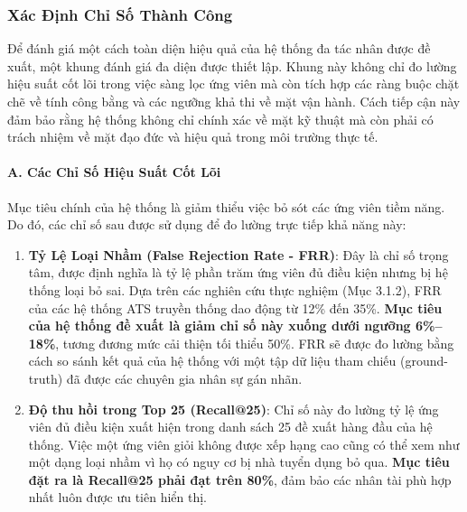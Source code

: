 \documentclass{article}
\begin{document}
\subsubsection{Xác Định Chỉ Số Thành Công}
Để đánh giá một cách toàn diện hiệu quả của hệ thống đa tác nhân được đề xuất, một khung đánh giá đa diện được thiết lập. Khung này không chỉ đo lường hiệu suất cốt lõi trong việc sàng lọc ứng viên mà còn tích hợp các ràng buộc chặt chẽ về tính công bằng và các ngưỡng khả thi về mặt vận hành. Cách tiếp cận này đảm bảo rằng hệ thống không chỉ chính xác về mặt kỹ thuật mà còn phải có trách nhiệm về mặt đạo đức và hiệu quả trong môi trường thực tế.

\paragraph{A. Các Chỉ Số Hiệu Suất Cốt Lõi}

Mục tiêu chính của hệ thống là giảm thiểu việc bỏ sót các ứng viên tiềm năng. Do đó, các chỉ số sau được sử dụng để đo lường trực tiếp khả năng này:
\begin{enumerate}[topsep=0pt, itemsep=4pt, leftmargin=40pt, label=\arabic*.]
    \item \textbf{Tỷ Lệ Loại Nhầm (False Rejection Rate - FRR)}: Đây là chỉ số trọng tâm, được định nghĩa là tỷ lệ phần trăm ứng viên đủ điều kiện nhưng bị hệ thống loại bỏ sai. Dựa trên các nghiên cứu thực nghiệm (Mục 3.1.2), FRR của các hệ thống ATS truyền thống dao động từ 12\% đến 35\%. \textbf{Mục tiêu của hệ thống đề xuất là giảm chỉ số này xuống dưới ngưỡng 6\%–18\%}, tương đương mức cải thiện tối thiểu 50\%. FRR sẽ được đo lường bằng cách so sánh kết quả của hệ thống với một tập dữ liệu tham chiếu (ground-truth) đã được các chuyên gia nhân sự gán nhãn.
   \item \textbf{Độ thu hồi trong Top 25 (Recall@25)}: Chỉ số này đo lường tỷ lệ ứng viên đủ điều kiện xuất hiện trong danh sách 25 đề xuất hàng đầu của hệ thống. Việc một ứng viên giỏi không được xếp hạng cao cũng có thể xem như một dạng loại nhầm vì họ có nguy cơ bị nhà tuyển dụng bỏ qua. \textbf{Mục tiêu đặt ra là Recall@25 phải đạt trên 80\%}, đảm bảo các nhân tài phù hợp nhất luôn được ưu tiên hiển thị.
\end{enumerate}
\end{document}
